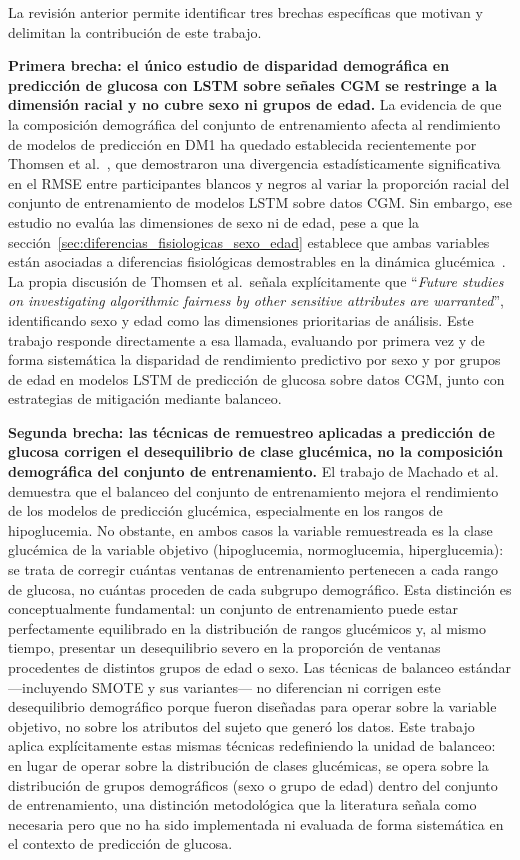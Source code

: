 La revisión anterior permite identificar tres brechas específicas que motivan y
delimitan la contribución de este trabajo.

\textbf{Primera brecha: el único estudio de disparidad demográfica en predicción
de glucosa con LSTM sobre señales CGM se restringe a la dimensión racial y no
cubre sexo ni grupos de edad.} La evidencia de que la composición demográfica del
conjunto de entrenamiento afecta al rendimiento de modelos de predicción en DM1
ha quedado establecida recientemente por Thomsen et al.~\cite{thomsen2025racial},
que demostraron una divergencia estadísticamente significativa en el RMSE entre
participantes blancos y negros al variar la proporción racial del conjunto de
entrenamiento de modelos LSTM sobre datos CGM. Sin embargo, ese estudio no
evalúa las dimensiones de sexo ni de edad, pese a que la
sección~\ref{sec:diferencias_fisiologicas_sexo_edad} establece que ambas
variables están asociadas a diferencias fisiológicas demostrables en la dinámica
glucémica~\cite{sandig2020cgm}. La propia discusión de Thomsen et al.\ señala
explícitamente que ``\textit{Future studies on investigating algorithmic fairness
by other sensitive attributes are warranted}'', identificando sexo y edad como
las dimensiones prioritarias de análisis. Este trabajo responde directamente a
esa llamada, evaluando por primera vez y de forma sistemática la disparidad de
rendimiento predictivo por sexo y por grupos de edad en modelos LSTM de
predicción de glucosa sobre datos CGM, junto con estrategias de mitigación
mediante balanceo.

\textbf{Segunda brecha: las técnicas de remuestreo aplicadas a predicción de
glucosa corrigen el desequilibrio de clase glucémica, no la composición
demográfica del conjunto de entrenamiento.} El trabajo de Machado et
al.~\cite{machado2023balancing} demuestra que el balanceo del conjunto de entrenamiento mejora el rendimiento de
los modelos de predicción glucémica, especialmente en los rangos de hipoglucemia.
No obstante, en ambos casos la variable remuestreada es la clase glucémica de la
variable objetivo (hipoglucemia, normoglucemia, hiperglucemia): se trata de
corregir cuántas ventanas de entrenamiento pertenecen a cada rango de glucosa, no
cuántas proceden de cada subgrupo demográfico. Esta distinción es conceptualmente
fundamental: un conjunto de entrenamiento puede estar perfectamente equilibrado en
la distribución de rangos glucémicos y, al mismo tiempo, presentar un desequilibrio
severo en la proporción de ventanas procedentes de distintos grupos de edad o
sexo. Las técnicas de balanceo estándar —incluyendo SMOTE y sus variantes— no
diferencian ni corrigen este desequilibrio demográfico porque fueron diseñadas
para operar sobre la variable objetivo, no sobre los atributos del sujeto que
generó los datos. Este trabajo aplica explícitamente estas mismas técnicas
redefiniendo la unidad de balanceo: en lugar de operar sobre la distribución de
clases glucémicas, se opera sobre la distribución de grupos demográficos (sexo o
grupo de edad) dentro del conjunto de entrenamiento, una distinción metodológica
que la literatura señala como necesaria pero que no ha sido implementada ni
evaluada de forma sistemática en el contexto de predicción de glucosa.


